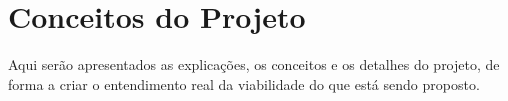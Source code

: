 \chapter{Conceitos do Projeto}
\par Aqui serão apresentados as explicações, os conceitos e os detalhes do projeto, de forma a criar o entendimento real da viabilidade do que está sendo proposto.




